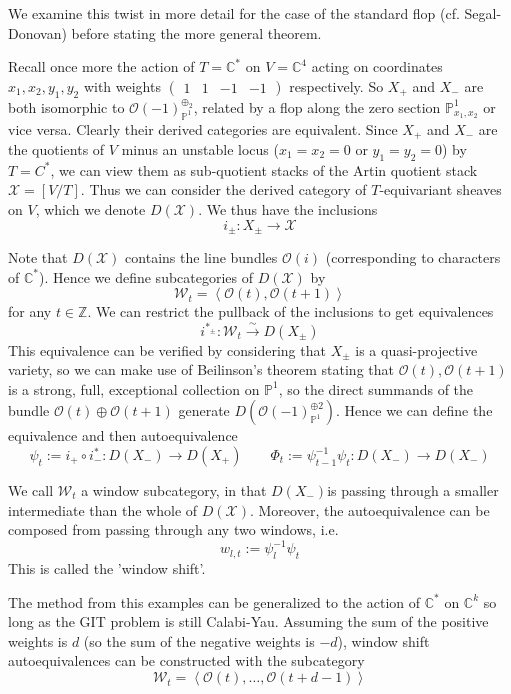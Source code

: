 We examine this twist in more detail for the case of the standard flop (cf. Segal-Donovan) before stating the more general theorem. 

Recall once more the action of $T = \mathbb{C}^*$ on $V = \mathbb{C}^4$  acting on coordinates $x_{1}, x_{2}, y_{1},y_{2}$ with weights $\begin{pmatrix}1&1&-1&-1\end{pmatrix}$ respectively. So $X_+$ and $X_-$ are both isomorphic to $\mathcal{O}(-1)_{\mathbb{P}^1}^{\oplus_{2}}$, related by a flop along the zero section $\mathbb{P}^1_{x_{1},x_{2}}$ or vice versa. Clearly their derived categories are equivalent. Since $X_+$ and $X_-$ are the quotients of $V$ minus an unstable locus ($x_{1}= x_{2}= 0$ or $y_{1}= y_{2}=0$)  by $T = C^{*}$, we can view them as sub-quotient stacks of the Artin quotient stack $\mathcal{X}=[V/T]$. Thus we can consider the derived category of $T$-equivariant sheaves on $V$, which we denote $D(\mathcal{X})$. We thus have the inclusions $$i_{\pm}: X_{\pm}\to \mathcal{X}$$

Note that $D(\mathcal{X})$ contains the line bundles $\mathcal{O}(i)$ (corresponding to characters of $\mathbb{C}^*$).  Hence we define subcategories of $D(\mathcal{X})$ by $$
\mathcal{W}_{t}= \left< \mathcal{O}(t), \mathcal{O}(t+1) \right> $$ for any $t \in \mathbb{Z}$. We can restrict the pullback of the inclusions to get equivalences $$i^{*_{\pm}}:\mathcal{W}_{t} \xrightarrow{\sim} D(X_{\pm})$$
This equivalence can be verified by considering that $X_\pm$ is a quasi-projective variety, so we can make use of Beilinson's theorem stating that $\mathcal{O}(t), \mathcal{O}(t+1)$ is a strong, full, exceptional collection on $\mathbb{P}^1$, so the direct summands of the bundle $\mathcal{O}(t)\oplus \mathcal{O}(t+1)$ generate  $D(\mathcal{O}(-1)_{\mathbb{P}^{1}}^{\oplus {2}})$.  Hence we can define the equivalence and then autoequivalence $$\psi_{t}:= i_{+}\circ i_{-}^{*}: D(X_{-})\to D(X_{+}) \qquad \Phi_{t}:= \psi_{t-1}^{-1}\psi_{t}: D(X_{-})\to D(X_{-})$$

We call $\mathcal{W}_t$ a window subcategory, in that $D(X_{-})$is passing through a smaller intermediate than the whole of $D(\mathcal{X})$. Moreover, the autoequivalence can be composed from passing through any two windows, i.e. $$w_{l,t}:= \psi_{l}^{-1}\psi_t $$
This is called the 'window shift'. 

\begin{remark}{}{}
	 The method from this examples can be generalized to the action of $\mathbb{C}^*$ on $\mathbb{C}^k$ so long as the GIT problem is still Calabi-Yau. Assuming the sum of the positive weights is $d$ (so the sum of the negative weights is $-d$), window shift autoequivalences can be constructed with the subcategory $$\mathcal{W}_{t}= \left< \mathcal{O}(t),\dots, \mathcal{O}(t+d-1) \right> $$
\end{remark}

